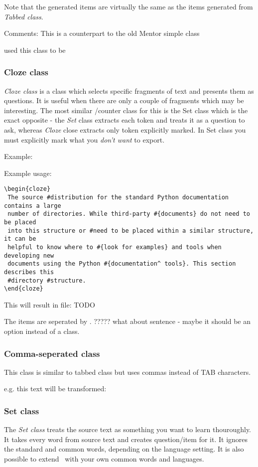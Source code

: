 \documentclass[a4paper,11pt]{article}
\newcommand{\probe}{\emph{\sc{probe{}}}}
\begin{document}
Note that the generated items are virtually the same as the items generated
from \emph{Tabbed class}.

Comments:
This is a counterpart to the old Mentor simple class

used this class to be

\subsubsection{Cloze class}
\emph{Cloze class} is a class which selects specific fragments of text and
presents them as questions.
It is useful when there are only a couple of fragments which may be
interesting.
The most similar  /counter class for this is the Set class which is the exact
opposite - the \emph{Set} class extracts each token and treats it as a question to
ask, whereas \emph{Cloze} close extracts only token explicitly marked. In Set class
you must explicitly mark what you \emph{don't want} to export.


Example:

Example usage:
\begin{verbatim}
\begin{cloze}
 The source #distribution for the standard Python documentation contains a large
 number of directories. While third-party #{documents} do not need to be placed
 into this structure or #need to be placed within a similar structure, it can be
 helpful to know where to #{look for examples} and tools when developing new
 documents using the Python #{documentation^ tools}. This section describes this
 #directory #structure.
\end{cloze}
\end{verbatim}

This will result in file:
TODO

The items are seperated by . ????? what about sentence - maybe it should be an
option instead of a class.


\subsubsection{Comma-seperated class}
This class is similar to tabbed class but uses commas instead of TAB
characters.

e.g. this text will be transformed:


\subsubsection{Set class}
The \emph{Set class} treats the source text as something you want to learn
thouroughly. It takes every word from source text and creates question/item for
it.
It ignores the standard and common words, depending on the language setting. It
is also possible to extend \probe\ with your own common words and languages.
\end{document}
